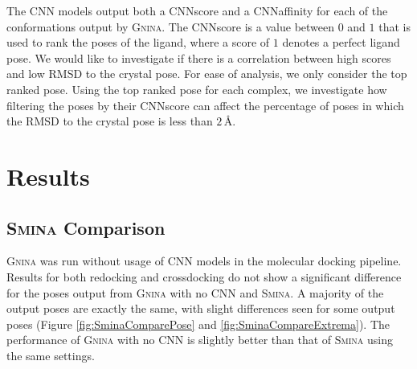 \documentclass[journal=jcisd8,manuscript=article]{achemso}
\begin{document}
The CNN models output both a CNNscore and a CNNaffinity for each of the conformations output by \textsc{Gnina}. The CNNscore is a value between $0$ and $1$ that is used to rank the poses of the ligand, where a score of $1$ denotes a perfect ligand pose. We would like to investigate if there is a correlation between high scores and low RMSD to the crystal pose. For ease of analysis, we only consider the top ranked pose. Using the top ranked pose for each complex, we investigate how filtering the poses by their CNNscore can affect the percentage of poses in which the RMSD to the crystal pose is less than $2\,$\AA.

\section{Results}
\subsection{\textsc{Smina} Comparison}
\textsc{Gnina} was run without usage of CNN models in the molecular docking pipeline. Results for both redocking and crossdocking do not show a significant difference for the poses output from \textsc{Gnina} with no CNN and \textsc{Smina}. A majority of the output poses are exactly the same, with slight differences seen for some output poses (Figure \ref{fig:SminaComparePose} and \ref{fig:SminaCompareExtrema}). The performance of \textsc{Gnina} with no CNN is slightly better than that of \textsc{Smina} using the same settings.
\end{document}
